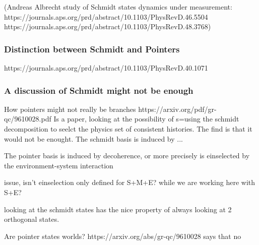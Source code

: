 \documentclass{article}
\begin{document}
(Andreas Albrecht study of Schmidt states dynamics under measurement:
https://journals.aps.org/prd/abstract/10.1103/PhysRevD.46.5504
https://journals.aps.org/prd/abstract/10.1103/PhysRevD.48.3768)

\subsubsection{Distinction between Schmidt and Pointers}
https://journals.aps.org/prd/abstract/10.1103/PhysRevD.40.1071



\subsubsection{A discussion of Schmidt might not be enough}
How pointers might not really be branches https://arxiv.org/pdf/gr-qc/9610028.pdf
Is a paper, looking at the possibility of s=using the schmidt decomposition to seelct the physics set of consistent histories. The find is that it would not be enought.
The schmidt basis is induced by ...

The pointer basis is induced by decoherence, or more precisely is einselected by the environment-system interaction

issue, isn't einselection only defined for S+M+E? while we are working here with S+E?

looking at the schmidt states has the nice property of always looking at 2 orthogonal states.

Are pointer states worlds? https://arxiv.org/abs/gr-qc/9610028 says that no
\end{document}
